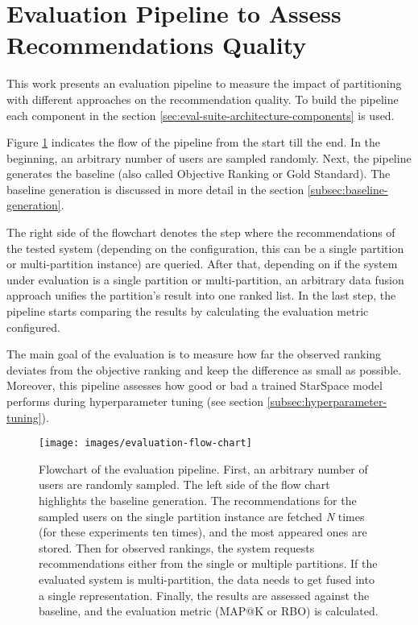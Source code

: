 \section{Evaluation Pipeline to Assess Recommendations Quality}
\label{sec:evaluation-pipeline}
This work presents an evaluation pipeline to measure the impact of partitioning with different approaches on the recommendation quality. To build the pipeline each component in the section \ref{sec:eval-suite-architecture-components} is used. 

Figure \ref{fig:flowchart-evaluation-pipeline} indicates the flow of the pipeline from the start till the end. In the beginning, an arbitrary number of users are sampled randomly. Next, the pipeline generates the baseline (also called Objective Ranking or Gold Standard). The baseline generation is discussed in more detail in the section \ref{subsec:baseline-generation}.


The right side of the flowchart denotes the step where the recommendations of the tested system (depending on the configuration, this can be a single partition or multi-partition instance) are queried. After that, depending on if the system under evaluation is a single partition or multi-partition, an arbitrary data fusion approach unifies the partition's result into one ranked list. In the last step, the pipeline starts comparing the results by calculating the evaluation metric configured. 

The main goal of the evaluation is to measure how far the observed ranking deviates from the objective ranking and keep the difference as small as possible. Moreover, this pipeline assesses how good or bad a trained StarSpace model performs during hyperparameter tuning (see section \ref{subsec:hyperparameter-tuning}).

\begin{figure}[!htb]
    \centering
    \texttt{[image: images/evaluation-flow-chart]}
    \caption{Flowchart of the evaluation pipeline. First, an arbitrary number of users are randomly sampled. The left side of the flow chart highlights the baseline generation. The recommendations for the sampled users on the single partition instance are fetched \emph{N} times (for these experiments ten times), and the most appeared ones are stored. Then for observed rankings, the system requests recommendations either from the single or multiple partitions. If the evaluated system is multi-partition, the data needs to get fused into a single representation. Finally, the results are assessed against the baseline, and the evaluation metric (MAP@K or RBO) is calculated.}
    \label{fig:flowchart-evaluation-pipeline}
\end{figure}

